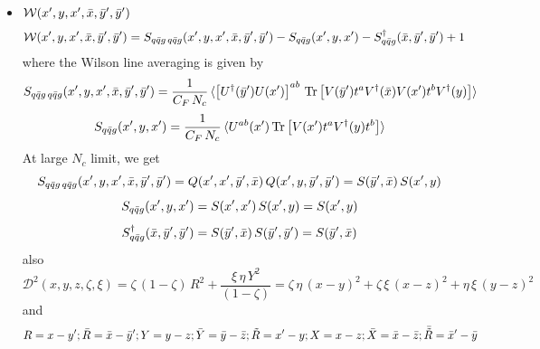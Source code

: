 \documentclass[9pt]{article}
\numberwithin{equation}{section}
\begin{document}
\begin{itemize}
\begin{align}
    Q(x,z,\Bar{y}',\Bar{x}) & = S(x,z)\,S(\Bar{y}',\Bar{x}) - \frac{F(x,z;\Bar{y}',\Bar{x})}{F(x,\Bar{y}';z,\Bar{x})}\, \left[S(x,z)\,S(\Bar{y}',\Bar{x})-S(x,\Bar{x})\,S(\Bar{y}',z)\right]
\end{align}
\item $\mathcal{W}(x',y,x',\Bar{x},\Bar{y}',\Bar{y}')$
    \begin{align}
        \mathcal{W}(x',y,x',\Bar{x},\Bar{y}',\Bar{y}') & = S_{q\Bar{q}g\,q\Bar{q}g}(x',y,x',\Bar{x},\Bar{y}',\Bar{y}') -S_{q\Bar{q}g}(x',y,x') - S^{\dagger}_{q\Bar{q}g}(\Bar{x},\Bar{y}',\Bar{y}') + 1
    \end{align}
where the Wilson line averaging is given by 
$$S_{q\Bar{q}g\,q\Bar{q}g}(x',y,x',\Bar{x},\Bar{y}',\Bar{y}') = \frac{1}{C_{F}\,N_{c}}\, \langle \left[U^{\dagger}(\Bar{y}')U(x')\right]^{ab}\, \text{Tr}\left[V(\Bar{y}')t^{a}V^{\dagger}(\Bar{x})V(x')t^{b}V^{\dagger}(y)\right] \rangle$$
$$S_{q\Bar{q}g}(x',y,x') =  \frac{1}{C_{F}\,N_{c}}\, \langle U^{ab}(x')\,\text{Tr}\left[V(x')t^{a}V^{\dagger}(y)t^{b}\right]\rangle$$
At large $N_{c}$ limit, we get
$$S_{q\Bar{q}g\,q\Bar{q}g}(x',y,x',\Bar{x},\Bar{y}',\Bar{y}') = Q(x',x',\Bar{y}',\Bar{x})\, Q(x',y,\Bar{y}',\Bar{y}') = S(\Bar{y}',\Bar{x})\, S(x',y) $$
$$S_{q\Bar{q}g}(x',y,x') = S(x',x')\, S(x',y) = S(x',y)$$
$$S^{\dagger}_{q\Bar{q}g}(\Bar{x},\Bar{y}',\Bar{y}') = S(\Bar{y}',\Bar{x})\, S(\Bar{y}',\Bar{y}') = S(\Bar{y}',\Bar{x}) $$
also  $$\mathcal{D}^{2}(x,y,z,\zeta,\xi) = \zeta\,(1-\zeta)\,R^{2} + \frac{\xi\,\eta\,Y^{2}}{(1-\zeta)} = \zeta\,\eta\,(x-y)^{2} + \zeta\,\xi\,(x-z)^{2} + \eta\,\xi\,(y-z)^{2}$$ 
and
$$R = x-y'; \Bar{R} = \Bar{x}-\Bar{y}'; Y = y-z; \Bar{Y} = \Bar{y}-\Bar{z}; \Tilde{R} = x'-y; X = x-z; \Bar{X} = \Bar{x}-\Bar{z}; \Bar{\Tilde{R}} = \Bar{x}'-\Bar{y}$$
\end{itemize}
\appendix
\end{document}
